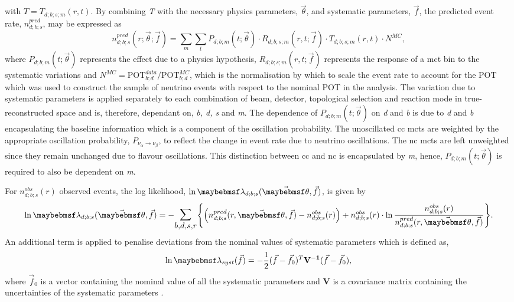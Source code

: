 with $T = T_{d;b;s;m}(r, t)$. By combining \textit{T} with the necessary physics parameters, $\vec{\theta}$, and systematic parameters, $\vec{f}$, the predicted event rate, $n^{pred}_{d;b;s}$, may be expressed as
\begin{equation}
n_{d;b;s}^{pred}(r; \vec{\theta}; \vec{f}) =
   \sum_{m} \sum_{t}  P_{d;b;m}(t; \vec{\theta}) \cdot R_{d;b;s;m}(r,t; \vec{f}) \cdot T_{d;b;s;m}(r,t) \cdot N^{MC},
   \label{eq:valor_npred}
\end{equation}
where $P_{d;b;m}(t; \vec{\theta})$ represents the effect due to a physics hypothesis, $R_{d;b;s;m}(r,t; \vec{f})$ represents the response of a \gls{mct} bin to the systematic variations and $N^{MC} = \mbox{POT}_{b;d}^{data}/\mbox{POT}_{b;d}^{MC}$, which is the normalisation by which to scale the event rate to account for the POT which was used to construct the sample of neutrino events with respect to the nominal POT in the analysis. The variation due to systematic parameters is applied separately to each combination of beam, detector, topological selection and reaction mode in true-reconstructed space and is, therefore, dependant on, \textit{b, d, s} and \textit{m}. The dependence of $P_{d;b;m}(t; \vec{\theta})$ on \textit{d} and \textit{b} is due to \textit{d} and \textit{b} encapsulating the baseline information which is a component of the oscillation probability. The unoscillated \gls{cc} \glspl{mct} are weighted by the appropriate oscillation probability, $P_{\nu_{\alpha} \rightarrow \nu_{\beta}}$, to reflect the change in event rate due to neutrino oscillations. The \gls{nc} \glspl{mct} are left unweighted since they remain unchanged due to flavour oscillations. This distinction between \gls{cc} and \gls{nc} is encapsulated by \textit{m}, hence, $P_{d;b;m}(t; \vec{\theta})$ is required to also be dependent on \textit{m}. 

For $n_{d ; b ; s}^{obs}(r)$ observed events, the log likelihood, $\lnOf{\lambda_{d;b;s}(\vec \theta, \vec f)}$, is given by
\begin{equation}
    \lnOf{\lambda_{d;b;s}(\vec \theta, \vec f)} = - \mathlarger{\mathlarger{\sum_{b,d,s,r}}} \Bigg \{ \Big (n_{d;b;s}^{pred}(r,\vec{\theta},\vec{f})
    - n_{d ; b ; s}^{obs}(r) \Big) + n_{d ; b ; s}^{obs}(r) \cdot \lnOf{\frac{n_{d ; b ; s}^{obs}(r)}{n_{d ; b ; s}^{p r e d}(r , \vec{\theta} , \vec{f})}} \Bigg \}.
\end{equation}
An additional term is applied to penalise deviations from the nominal values of systematic parameters which is defined as,
\begin{equation}
    \lnOf{\lambda_{syst}(\vec{f})} = -\frac{1}{2} (\vec{f} - \vec{f}_0)^T \mathbf{V^{-1}} (\vec{f} - \vec{f}_0),
\end{equation}
where $\vec{f}_0$ is a vector containing the nominal value of all the systematic parameters and \textbf{V} is a covariance matrix containing the uncertainties of the systematic parameters \cite{VALOR_dune}. 

